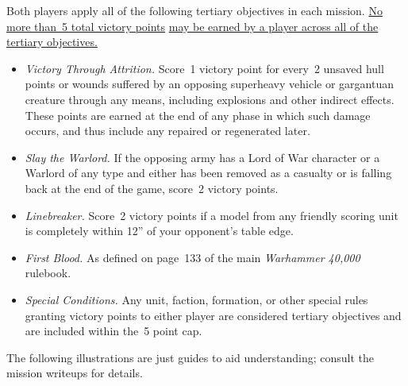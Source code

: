 \documentclass{40k}
\begin{document}

Both players apply all of the following tertiary objectives in each
mission.  \underline{No more than~5 total victory points}
\underline{may be earned by a player across all of the tertiary
  objectives.}

\begin{itemize}
\item \textit{Victory Through Attrition.}  Score~1 victory point for
  every~2 unsaved hull points or wounds suffered by an opposing
  superheavy vehicle or gargantuan creature through any means,
  including explosions and other indirect effects.  These points are
  earned at the end of any phase in which such damage occurs, and thus
  include any repaired or regenerated later.

\item \textit{Slay the Warlord.}  If the opposing army has a Lord of
  War character or a Warlord of any type and either has been removed
  as a casualty or is falling back at the end of the game, score~2
  victory points.

\item \textit{Linebreaker.}  Score~2 victory points if a model from
  any friendly scoring unit is completely within 12'' of your
  opponent's table edge.

\item \textit{First Blood.}  As defined on page~133 of the main
  \emph{Warhammer 40,000} rulebook.

\item \textit{Special Conditions.}  Any unit, faction, formation, or
  other special rules granting victory points to either player are
  considered tertiary objectives and are included within the~5 point
  cap.
\end{itemize}


\clearpage
{}

The following illustrations are just guides to aid understanding;
consult the mission writeups for details.




\end{document}
